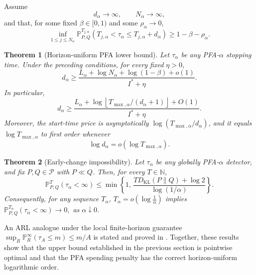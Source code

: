 \documentclass[12pt]{article}
\theoremstyle{spaced}
\newtheorem{theorem}{Theorem}[section]
\theoremstyle{remark}
\newcommand{\Pinf}[1]{\mathbb P_{#1}^{\infty}}
\begin{document}
Assume
\[
    d_\alpha\longrightarrow\infty,
    \qquad
    N_\alpha\longrightarrow\infty,
\]
and that, for some fixed \(\beta\in[0,1)\) and some
\(\rho_\alpha\to0\),
\begin{equation}
\label{eq:horizon-uniform-power}
    \inf_{1\le j\le N_\alpha}
    \mathbb P_{P,Q}^{T_{j,\alpha}}
    \left(
        T_{j,\alpha}<\tau_\alpha
        \le T_{j,\alpha}+d_\alpha
    \right)
    \ge
    1-\beta-\rho_\alpha.
\end{equation}

\begin{theorem}[Horizon-uniform PFA lower bound]
\label{thm:horizon-lower} Let \(\tau_\alpha\) be any PFA-\(\alpha\) stopping time.
Under the preceding conditions, for every fixed \(\eta>0\),
\begin{equation}
\label{eq:horizon-lower}
    d_\alpha
    \ge
    \frac{
        L_\alpha+\log N_\alpha+\log(1-\beta)+o(1)
    }{
        I^*+\eta
    }.
\end{equation}
In particular,
\[
    d_\alpha
    \ge
    \frac{
        L_\alpha+
        \log\left\lfloor
            T_{\max,\alpha}/(d_\alpha+1)
        \right\rfloor
        +O(1)
    }{
        I^*+\eta
    }.
\]
Moreover, the start-time price is asymptotically
\(\log(T_{\max,\alpha}/d_\alpha)\), and it equals
\(\log T_{\max,\alpha}\) to first order whenever
\[
    \log d_\alpha=o(\log T_{\max,\alpha}).
\]
\end{theorem}


\begin{theorem}[Early-change impossibility]
\label{thm:early-change-impossibility}
Let \(\tau_\alpha\) be any globally PFA-\(\alpha\) detector, and fix
\(P,Q\in\mathcal P\) with \(P\ll Q\). Then, for every \(T\in\mathbb N\),
\[
    \mathbb P_{P,Q}^{T}(\tau_\alpha<\infty)
    \le
    \min\left\{
        1,\,
        \frac{
            T D_{\mathrm{KL}}(P\|Q)+\log 2
        }{
            \log(1/\alpha)
        }
    \right\}.
\]
Consequently, for any sequence \(T_\alpha\),
$T_\alpha 
    =
    o\!\left(\log\frac1\alpha\right)$
implies
$\mathbb P_{P,Q}^{T_\alpha}(\tau_\alpha<\infty)\longrightarrow0,$ as $\alpha\downarrow0$.
\end{theorem}

An ARL analogue under the local finite-horizon guarantee
$\sup_R\Pinf R(\tau_A\le m)\le m/A$ is stated and proved in .
Together, these results show that the upper bound established in the previous section is pointwise optimal and
that the PFA spending penalty has the correct horizon-uniform logarithmic
order.
\end{document}
